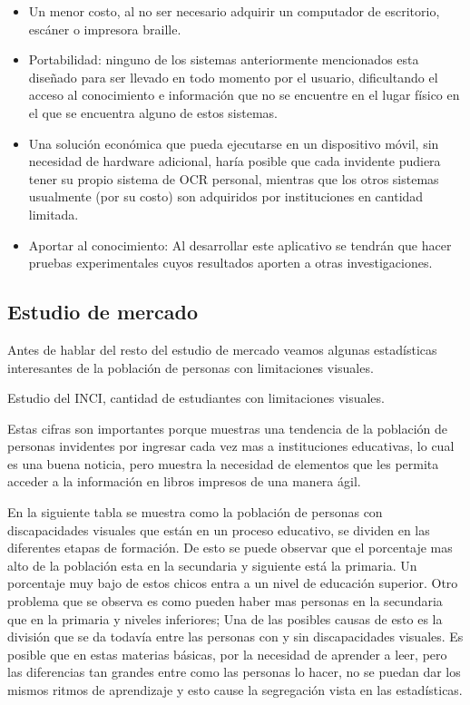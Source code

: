 \documentclass[a4paper, 12pt, oneside]{article}
\begin{document}
	\begin{itemize} 
	\item Un menor costo, al no ser necesario adquirir un computador de escritorio, escáner o impresora braille.
	\item Portabilidad: ninguno de los sistemas anteriormente mencionados esta diseñado para ser llevado en todo momento por el usuario, dificultando el acceso al conocimiento e información que no se encuentre en el lugar físico en el que se encuentra alguno de estos sistemas.
	\item Una solución económica que pueda ejecutarse en un dispositivo móvil, sin necesidad de hardware adicional, haría posible que cada invidente pudiera tener su propio sistema de OCR personal, mientras que los otros sistemas usualmente (por su costo) son adquiridos por instituciones en cantidad limitada.
	\item Aportar al conocimiento: Al desarrollar este aplicativo se tendrán que hacer pruebas experimentales cuyos resultados aporten a otras investigaciones.
	\end{itemize}

\clearpage

	\begin{center}
	\section{Estudio de mercado}
	\end{center}

	Antes de hablar del resto del estudio de mercado veamos algunas estadísticas interesantes de la población de personas con limitaciones visuales.

	Estudio del INCI, cantidad de estudiantes con limitaciones visuales.

	Estas cifras son importantes porque muestras una tendencia de la población de personas invidentes por ingresar cada vez mas a instituciones educativas, lo cual es una buena noticia, pero muestra la necesidad de elementos que les permita acceder a la información en libros impresos de una manera ágil.

	En la siguiente tabla se muestra como la población de personas con discapacidades visuales que están en un proceso educativo, se dividen en las diferentes etapas de formación. De esto se puede observar que el porcentaje mas alto de la población esta en la secundaria y siguiente está la primaria. Un porcentaje muy bajo de estos chicos entra a un nivel de educación superior. Otro problema que se observa es como pueden haber mas personas en la secundaria que en la primaria y niveles inferiores; Una de las posibles causas de esto es la división que se da todavía entre las personas con y sin discapacidades visuales. Es posible que en estas materias básicas, por la necesidad de aprender a leer, pero las diferencias tan grandes entre como las personas lo hacer, no se puedan dar los mismos ritmos de aprendizaje y esto cause la segregación vista en las estadísticas.
\end{document}

